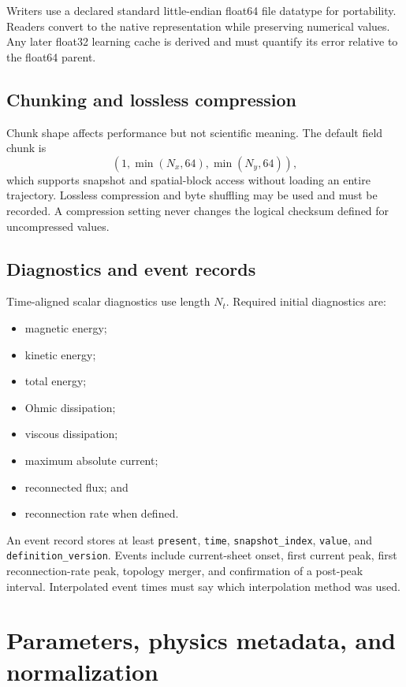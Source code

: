 \documentclass[11pt]{article}
\newcommand{\code}[1]{\texttt{#1}}
\begin{document}
Writers use a declared standard little-endian float64 file datatype for portability. Readers convert to the native representation while preserving numerical values. Any later float32 learning cache is derived and must quantify its error relative to the float64 parent.

\subsection{Chunking and lossless compression}

Chunk shape affects performance but not scientific meaning. The default field chunk is
\begin{equation}
(1,\min(N_x,64),\min(N_y,64)),
\end{equation}
which supports snapshot and spatial-block access without loading an entire trajectory. Lossless compression and byte shuffling may be used and must be recorded. A compression setting never changes the logical checksum defined for uncompressed values.

\subsection{Diagnostics and event records}

Time-aligned scalar diagnostics use length $N_t$. Required initial diagnostics are:
\begin{itemize}
  \item magnetic energy;
  \item kinetic energy;
  \item total energy;
  \item Ohmic dissipation;
  \item viscous dissipation;
  \item maximum absolute current;
  \item reconnected flux; and
  \item reconnection rate when defined.
\end{itemize}

An event record stores at least \code{present}, \code{time}, \code{snapshot\_index}, \code{value}, and \code{definition\_version}. Events include current-sheet onset, first current peak, first reconnection-rate peak, topology merger, and confirmation of a post-peak interval. Interpolated event times must say which interpolation method was used.

\section{Parameters, physics metadata, and normalization}
\label{sec:parameters}
\end{document}
